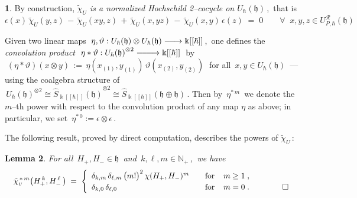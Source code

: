 \documentclass[12pt,reqno,twoside,a4paper]{amsart}
\numberwithin{equation}{section}
\newtheorem{lema}{Lemma}[subsection]
\theoremstyle{definition}
\newtheorem{free text}[lema]{}
\theoremstyle{remark}
\newcommand{\R}{{\mathcal R}}
\def \NN{\mathbb{N}}
\def \kh{{\Bbbk[[\hbar]]}}
\def \lieh{\mathfrak{h}}
\def \pf{\begin{proof}}
\def \epf{\end{proof}}
\theoremstyle{plain}
\begin{document}
\begin{free text}
\vskip9pt

   By construction,  \textsl{$ \tilde{\chi}_{\scriptscriptstyle U} $  is a normalized Hochschild 2--cocycle on  $ U_\hbar(\lieh) \, $},  \,that is
%
  $$  \epsilon(x) \,\tilde{\chi}_{\scriptscriptstyle U}(y,z) \, - \, \tilde{\chi}_{\scriptscriptstyle U}(xy,z) \,
  + \, \tilde{\chi}_{\scriptscriptstyle U}(x,yz) \,
  - \, \tilde{\chi}_{\scriptscriptstyle U}(x,y) \, \epsilon(z) \; = \; 0
  \qquad  \forall \;\; x, y, z \in U_{\!P,\hbar}^{\R}(\lieh)  $$
%

\vskip5pt

   Given two linear maps
   $ \, \eta , \vartheta : U_\hbar(\lieh) \otimes U_\hbar(\lieh) \relbar\joinrel\longrightarrow \kh \, $,
   \,one defines the  {\it convolution product\/}
   $ \; \eta \ast \vartheta : {U_\hbar(\lieh)}^{\otimes 2} \relbar\joinrel\relbar\joinrel\longrightarrow \kh \; $
 by  $ \; (\eta \ast \vartheta)(x \otimes y) \, := \, \eta(x_{(1)},y_{(1)}) \, \vartheta(x_{(2)},y_{(2)}) \; $
   for all  $ \, x, y \in U_\hbar(\lieh) \, $
   --- using the coalgebra structure of
   $ \, {U_\hbar(\lieh)}^{\otimes 2}\cong {\widehat{S}_\kh(\lieh)}^{\otimes 2}
   \cong \widehat{S}_\kh(\lieh \oplus \lieh) \, $.  Then by  $ \, \eta^{\ast\,m} \, $
   we denote the  $ m $--th  power with respect to the convolution
   product of any map  $ \eta $  as above; in particular, we set  $ \, \eta^{\ast\,0} := \epsilon \otimes \epsilon \, $.
                                                              \par
   The following result, proved by direct computation, describes the powers of  $ \tilde{\chi}_{\scriptscriptstyle U} \, $:
%
\end{free text}

\vskip5pt

\begin{lema}  \label{lem: tildechi}
%
For all  $ \, H_+ ,H_- \in \lieh \, $  and  $ \, k, \ell, m \in \NN_+ \, $,  \,we have
  $$  \quad   { \tilde{\chi}_{\scriptscriptstyle U}}^{\,\ast\,m}\big(H_+^{\,k},H_-^{\,\ell}\,\big) \; = \;
   \begin{cases}
      \begin{array}{lr}
  \delta_{k,m} \, \delta_{\ell,m} \, {\big(m!\big)}^2 \, \chi(H_+,H_-)^m  &  \quad  \text{for} \;\;\;\; m \geq 1 \; ,  \quad \hskip7pt \qquad \;   \hfill  \phantom{\square}  \\
  \delta_{k,0} \, \delta_{\ell,0} \,  &  \quad  \text{for} \;\;\;\; m = 0 \; .
  \quad \hskip7pt \qquad \;   \hfill  \square
      \end{array}
   \end{cases}  $$
%
\end{lema}
%
%
\end{document}
